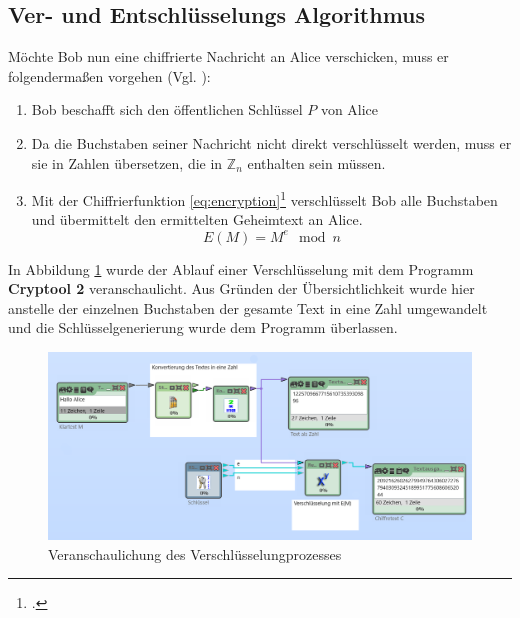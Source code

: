 \documentclass{scrarticle} %
\begin{document}
    \subsection{Ver- und Entschlüsselungs Algorithmus}
            Möchte Bob nun eine chiffrierte Nachricht an Alice verschicken, muss er folgendermaßen vorgehen (Vgl. \cite[71]{watjen2008}):
            \begin{enumerate}
                \item Bob beschafft sich den öffentlichen Schlüssel $P$ von Alice
                \item Da die Buchstaben seiner Nachricht nicht direkt verschlüsselt werden, muss er sie in Zahlen übersetzen, die in $\mathbb{Z}_n$ enthalten sein müssen. %
                \item
                Mit der Chiffrierfunktion \ref{eq:encryption}\footcite[77]{ertel2003} verschlüsselt Bob alle Buchstaben und übermittelt den ermittelten Geheimtext an Alice.
                \begin{equation}
                    E(M) = M^{e}\mod{n} \label{eq:encryption}
                \end{equation}
            \end{enumerate}
            In Abbildung \ref{fig:encrypt} wurde der Ablauf einer Verschlüsselung mit dem Programm \textbf{Cryptool 2} veranschaulicht. Aus Gründen der Übersichtlichkeit wurde hier anstelle der einzelnen Buchstaben der gesamte Text in eine Zahl umgewandelt und die Schlüsselgenerierung wurde dem Programm überlassen.
            \begin{figure}
                \includegraphics[width=\linewidth]{content/cryptool_encrypt_e1.png}
                \caption{Veranschaulichung des Verschlüsselungprozesses}
                \label{fig:encrypt}
            \end{figure}
\end{document}
